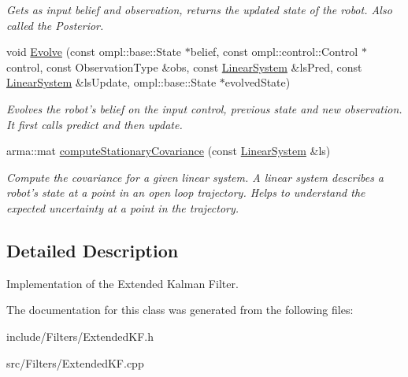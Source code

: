 \begin{DoxyCompactItemize}
\begin{DoxyCompactList}\small\item\em \-Gets as input belief and observation, returns the updated state of the robot. \-Also called the \-Posterior. \end{DoxyCompactList}\item 
\hypertarget{class_extended_k_f_abac2469798813a08cb9d482509bc6dce}{void \hyperlink{class_extended_k_f_abac2469798813a08cb9d482509bc6dce}{\-Evolve} (const ompl\-::base\-::\-State $\ast$belief, const ompl\-::control\-::\-Control $\ast$control, const \-Observation\-Type \&obs, const \hyperlink{class_linear_system}{\-Linear\-System} \&ls\-Pred, const \hyperlink{class_linear_system}{\-Linear\-System} \&ls\-Update, ompl\-::base\-::\-State $\ast$evolved\-State)}\label{class_extended_k_f_abac2469798813a08cb9d482509bc6dce}

\begin{DoxyCompactList}\small\item\em \-Evolves the robot's belief on the input control, previous state and new observation. \-It first calls predict and then update. \end{DoxyCompactList}\item 
\hypertarget{class_extended_k_f_a2aaf37aae5d4105c384f88b6c948e4cb}{arma\-::mat \hyperlink{class_extended_k_f_a2aaf37aae5d4105c384f88b6c948e4cb}{compute\-Stationary\-Covariance} (const \hyperlink{class_linear_system}{\-Linear\-System} \&ls)}\label{class_extended_k_f_a2aaf37aae5d4105c384f88b6c948e4cb}

\begin{DoxyCompactList}\small\item\em \-Compute the covariance for a given linear system. \-A linear system describes a robot's state at a point in an open loop trajectory. \-Helps to understand the expected uncertainty at a point in the trajectory. \end{DoxyCompactList}\end{DoxyCompactItemize}


\subsection{\-Detailed \-Description}
\-Implementation of the \-Extended \-Kalman \-Filter. 

\-The documentation for this class was generated from the following files\-:\begin{DoxyCompactItemize}
\item 
include/\-Filters/\-Extended\-K\-F.\-h\item 
src/\-Filters/\-Extended\-K\-F.\-cpp\end{DoxyCompactItemize}
